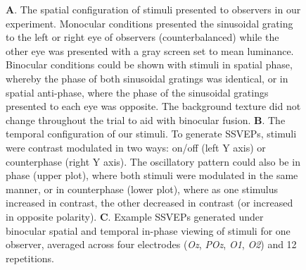 \documentclass[
  12pt,
]{article}
\begin{document}
\begin{figure}


\caption{\label{fig-methodFigures}\textbf{A}. The spatial configuration
of stimuli presented to observers in our experiment. Monocular
conditions presented the sinusoidal grating to the left or right eye of
observers (counterbalanced) while the other eye was presented with a
gray screen set to mean luminance. Binocular conditions could be shown
with stimuli in spatial phase, whereby the phase of both sinusoidal
gratings was identical, or in spatial anti-phase, where the phase of the
sinusoidal gratings presented to each eye was opposite. The background
texture did not change throughout the trial to aid with binocular
fusion. \textbf{B}. The temporal configuration of our stimuli. To
generate SSVEPs, stimuli were contrast modulated in two ways: on/off
(left Y axis) or counterphase (right Y axis). The oscillatory pattern
could also be in phase (upper plot), where both stimuli were modulated
in the same manner, or in counterphase (lower plot), where as one
stimulus increased in contrast, the other decreased in contrast (or
increased in opposite polarity). \textbf{C}. Example SSVEPs generated
under binocular spatial and temporal in-phase viewing of stimuli for one
observer, averaged across four electrodes (\emph{Oz}, \emph{POz},
\emph{O1}, \emph{O2}) and 12 repetitions.}

\end{figure}%
\end{document}
